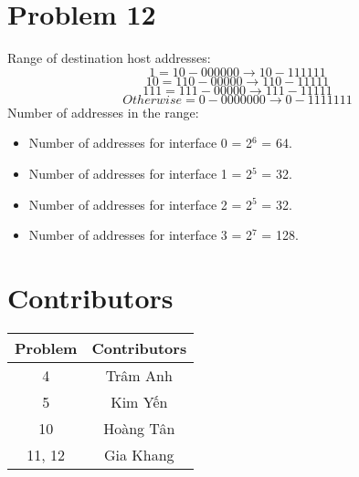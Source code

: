 \documentclass[12pt,a4paper]{article}
\begin{document}
\section*{Problem 12}
Range of destination host addresses:
\begin{equation*}
    1 = 10-000000 \rightarrow 10-111111 
\end{equation*}
\begin{equation*}
    10 = 110-00000 \rightarrow 110-11111
\end{equation*}
\begin{equation*}
    111 = 111-00000 \rightarrow 111-11111
\end{equation*}
\begin{equation*}
    Otherwise = 0-0000000 \rightarrow 0-1111111
\end{equation*}
Number of addresses in the range:
\begin{itemize}
    \item Number of addresses for interface 0 = 2$^6$ = 64.
    \item Number of addresses for interface 1 = 2$^5$ = 32.
    \item Number of addresses for interface 2 = 2$^5$ = 32.
    \item Number of addresses for interface 3 = 2$^7$ = 128.
\end{itemize}

\section*{Contributors}
\begin{table}[H]
    \centering
    \begin{tabular}{c|c}
    \toprule
     \bf{Problem }  & \textbf{Contributors} \\
     \midrule
     4 & Trâm Anh \\
     5 & Kim Yến \\
     10 & Hoàng Tân \\
     11, 12 & Gia Khang \\
     \bottomrule
    \end{tabular}
\end{table}
\end{document}
